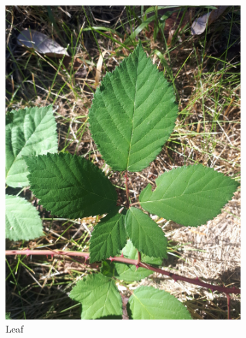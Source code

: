 \begin{figure}
\centering
\begin{subfigure}{0.48\textwidth}
    \includegraphics[width=\textwidth]{rubus/armeniacus_leaf_01}
    \caption{Leaf}
    \label{fig:rub:armeniacus:leaf}
\end{subfigure}
\hfill
\begin{subfigure}{0.48\textwidth}

\end{subfigure}
\end{figure}
